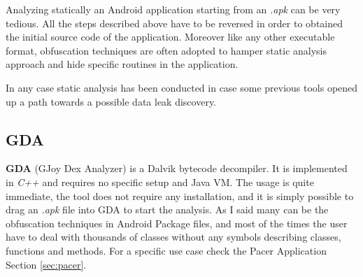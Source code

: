 	\par Analyzing statically an Android application starting from an \textit{.apk} can be very tedious. All the steps described above have to be reversed in order to obtained the initial source code of the application. Moreover like any other executable format, obfuscation techniques are often adopted to hamper static analysis approach and hide specific routines in the application. 
	\par In any case static analysis has been conducted in case some previous tools opened up a path towards a possible data leak discovery. 
	
		\subsection{GDA}
		\par \textbf{GDA} (GJoy Dex Analyzer) is a Dalvik bytecode decompiler. It is implemented in \textit{C++} and requires no specific setup and Java VM. The usage is quite immediate, the tool does not require any installation, and it is simply possible to drag an \textit{.apk} file into GDA to start the analysis. \newline 
	As I said many can be the obfuscation techniques in Android Package files, and most of the times the user have to deal with thousands of classes without any symbols describing classes, functions and methods.\newline
	For a specific use case check the Pacer Application Section \ref{sec:pacer}.
